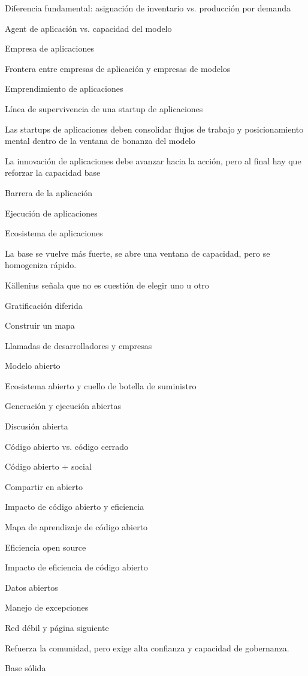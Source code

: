 \documentclass{article}
\begin{document}
Diferencia fundamental: asignación de inventario vs. producción por demanda

Agent de aplicación vs. capacidad del modelo

Empresa de aplicaciones

Frontera entre empresas de aplicación y empresas de modelos

Emprendimiento de aplicaciones

Línea de supervivencia de una startup de aplicaciones

Las startups de aplicaciones deben consolidar flujos de trabajo y posicionamiento mental dentro de la ventana de bonanza del modelo

La innovación de aplicaciones debe avanzar hacia la acción, pero al final hay que reforzar la capacidad base

Barrera de la aplicación

Ejecución de aplicaciones

Ecosistema de aplicaciones

La base se vuelve más fuerte, se abre una ventana de capacidad, pero se homogeniza rápido.

Källenius señala que no es cuestión de elegir uno u otro

Gratificación diferida

Construir un mapa

Llamadas de desarrolladores y empresas

Modelo abierto

Ecosistema abierto y cuello de botella de suministro

Generación y ejecución abiertas

Discusión abierta

Código abierto vs. código cerrado

Código abierto + social

Compartir en abierto

Impacto de código abierto y eficiencia

Mapa de aprendizaje de código abierto

Eficiencia open source

Impacto de eficiencia de código abierto

Datos abiertos

Manejo de excepciones

Red débil y página siguiente

Refuerza la comunidad, pero exige alta confianza y capacidad de gobernanza.

Base sólida
\end{document}
